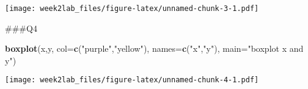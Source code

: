 \documentclass[]{article}
\newenvironment{Shaded}{\begin{snugshade}}{\end{snugshade}}
\newcommand{\DataTypeTok}[1]{\textcolor[rgb]{0.13,0.29,0.53}{#1}}
\newcommand{\KeywordTok}[1]{\textcolor[rgb]{0.13,0.29,0.53}{\textbf{#1}}}
\newcommand{\NormalTok}[1]{#1}
\newcommand{\StringTok}[1]{\textcolor[rgb]{0.31,0.60,0.02}{#1}}
\begin{document}
\texttt{[image: week2lab\_files/figure-latex/unnamed-chunk-3-1.pdf]}

\#\#\#Q4

\begin{Shaded}
\begin{Highlighting}[]
\KeywordTok{boxplot}\NormalTok{(x,y, }\DataTypeTok{col=}\KeywordTok{c}\NormalTok{(}\StringTok{"purple"}\NormalTok{,}\StringTok{"yellow"}\NormalTok{), }\DataTypeTok{names=}\KeywordTok{c}\NormalTok{(}\StringTok{"x"}\NormalTok{,}\StringTok{"y"}\NormalTok{), }\DataTypeTok{main=}\StringTok{"boxplot x and y"}\NormalTok{)}
\end{Highlighting}
\end{Shaded}

\texttt{[image: week2lab\_files/figure-latex/unnamed-chunk-4-1.pdf]}
\end{document}
